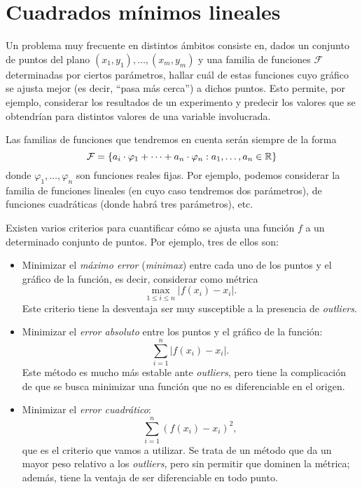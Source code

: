 
\section{Cuadrados mínimos lineales}
Un problema muy frecuente en distintos ámbitos consiste en, dados
un conjunto de puntos del plano $(x_1,y_1), \dots, (x_m,y_m)$ y una familia
de funciones $\mathcal{F}$ determinadas por ciertos parámetros, hallar
cuál de estas funciones cuyo gráfico se ajusta mejor (es decir, ``pasa más
cerca'') a dichos puntos. Esto permite, por ejemplo, considerar los resultados
de un experimento y predecir los valores que se obtendrían para distintos
valores de una variable involucrada.

Las familias de funciones que tendremos en cuenta serán siempre de la forma
\[ \mathcal{F} = \{ a_i \cdot \varphi_1 + \dots + a_n \cdot \varphi_n
    : a_1, \dots, a_n \in \mathbb{R} \} \]
donde $\varphi_1, \dots, \varphi_n$ son funciones reales fijas. Por ejemplo,
podemos considerar la familia de funciones lineales (en cuyo caso tendremos
dos parámetros), de funciones cuadráticas (donde habrá tres parámetros), etc.

Existen varios criterios para cuantificar cómo se ajusta una función $f$ a un
determinado conjunto de puntos. Por ejemplo, tres de ellos son:
\begin{itemize}
\item Minimizar el \emph{máximo error} (\emph{minimax}) entre cada uno de los
    puntos y el gráfico de la función, es decir, considerar como métrica
    \[ \max_{1\leq i \leq n} \left\vert f(x_i) - x_i \right\vert. \]
    Este criterio tiene la desventaja ser muy susceptible a la presencia
    de \emph{outliers}.
\item Minimizar el \emph{error absoluto} entre los puntos y el gráfico de la
    función:
    \[ \sum_{i = 1}^{n} \left\vert f(x_i) - x_i \right\vert. \]
    Este método es mucho más estable ante \emph{outliers}, pero tiene la
    complicación de que se busca minimizar una función que no es
    diferenciable en el origen.
\item Minimizar el \emph{error cuadrático}:
    \[ \sum_{i = 1}^{n} \left( f(x_i) - x_i \right)^2, \]
    que es el criterio que vamos a utilizar. Se trata de un método que da
    un mayor peso relativo a los \emph{outliers}, pero sin permitir que
    dominen la métrica; además, tiene la ventaja de ser diferenciable en todo
    punto.
\end{itemize}

